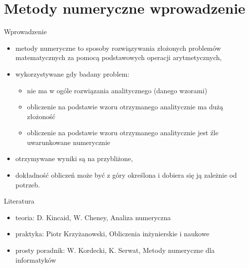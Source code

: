 \section{Metody numeryczne wprowadzenie}
\begin{frame}{Wprowadzenie}

	\begin{itemize}
		\item metody numeryczne to sposoby rozwiązywania złożonych problemów matematycznych za pomocą podstawowych operacji arytmetycznych,
		\item wykorzystywane gdy badany problem:
		\begin{itemize}
		    \item 	nie ma w ogóle rozwiązania analitycznego (danego 
		    wzorami)
		    \item obliczenie na podstawie wzoru otrzymanego analitycznie ma dużą złożoność
		    \item obliczenie na podstawie wzoru otrzymanego analitycznie  jest źle uwarunkowane numerycznie
		\end{itemize}
	\item otrzymywane  wyniki są na przybliżone, 
	\item dokładność obliczeń może być z góry określona i dobiera się ją zależnie od potrzeb. 
	\end{itemize}
     
\end{frame}
\begin{frame}{Literatura}

	\begin{itemize}
		     \item teoria: D. Kincaid, W. Cheney, Analiza numeryczna
		     \item praktyka: Piotr Krzyżanowski, Obliczenia inżynierskie i naukowe
		     \item prosty poradnik: W. Kordecki, K. Serwat, Metody numeryczne dla informatyków
		   
	\end{itemize}
     
\end{frame}